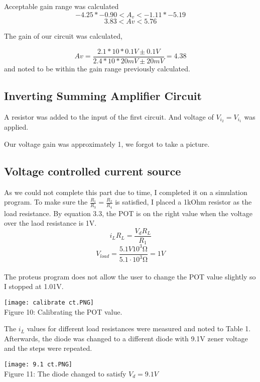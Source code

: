 \documentclass{article}
\begin{document}
Acceptable gain range was calculated
\[-4.25 * -0.90 < A_v < -1.11 * -5.19 \]
\[3.83 < Av < 5.76\]

The gain of our circuit was calculated,

\[Av = \frac{2.1*10*0.1V\pm 0.1V}{2.4*10*20mV \pm 20mV} = 4.38\]
\quad and noted to be within the gain range previously calculated.

\subsection{Inverting Summing Amplifier Circuit}

A resistor was added to the input of the first circuit. And voltage of $V_{i_2} = V_{i_1}$ was applied.

Our voltage gain was approximately 1,  we forgot to take a picture.

\subsection{Voltage controlled current source}

As we could not complete this part due to time, I completed it on a simulation program. To make sure the $\frac{R_1}{R_3} = \frac{R_2}{R_4}$ is satisfied, I placed a 1kOhm resistor as the load resistance. By equation 3.3, the POT is on the right value when the voltage over the laod resistance is 1V. \\
\[i_LR_L = \frac{V_dR_L}{R_1}\]
\[V_{load} = \frac{5.1V10^3\si{\ohm}}{5.1\cdot10^3\si{\ohm}} =1V\] \\
The proteus program does not allow the user to change the POT value slightly so I stopped at 1.01V.

\begin{center}
    \texttt{[image: calibrate ct.PNG]} \\
    Figure 10: Calibrating the POT value.
\end{center}

The $i_L$ values for different load resistances were measured and noted to Table 1. Afterwards, the diode was changed to a different diode with 9.1V zener voltage and the steps were repeated.\\

\begin{center}
    \texttt{[image: 9.1 ct.PNG]}\\
    Figure 11: The diode changed to satisfy $V_d = 9.1V$ 
\end{center}
\end{document}
